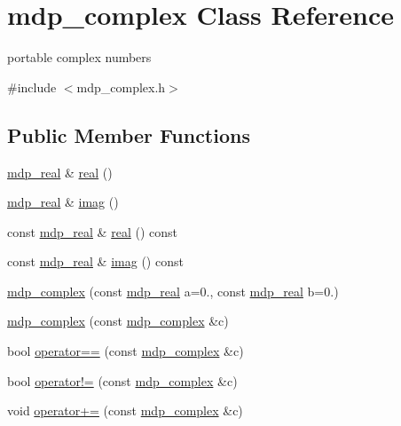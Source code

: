 \hypertarget{classmdp__complex}{}\section{mdp\+\_\+complex Class Reference}
\label{classmdp__complex}


portable complex numbers  




{\ttfamily \#include $<$mdp\+\_\+complex.\+h$>$}

\subsection*{Public Member Functions}
\begin{DoxyCompactItemize}
\item 
\hyperlink{mdp__global__vars_8h_a69d96b74c791e0bbdb888b3913a69450}{mdp\+\_\+real} \& \hyperlink{classmdp__complex_ad24f185648ad4231abbf362ed1fab64b}{real} ()
\item 
\hyperlink{mdp__global__vars_8h_a69d96b74c791e0bbdb888b3913a69450}{mdp\+\_\+real} \& \hyperlink{classmdp__complex_a6426bc039248f24201db0e4344bf2409}{imag} ()
\item 
const \hyperlink{mdp__global__vars_8h_a69d96b74c791e0bbdb888b3913a69450}{mdp\+\_\+real} \& \hyperlink{classmdp__complex_af691671fa4c4256da287ab8a017d3614}{real} () const
\item 
const \hyperlink{mdp__global__vars_8h_a69d96b74c791e0bbdb888b3913a69450}{mdp\+\_\+real} \& \hyperlink{classmdp__complex_ac44d1a0643e83891df5bfa32d0582e04}{imag} () const
\item 
\hyperlink{classmdp__complex_aeb3ec4ef78af98be64dc82c9a2105820}{mdp\+\_\+complex} (const \hyperlink{mdp__global__vars_8h_a69d96b74c791e0bbdb888b3913a69450}{mdp\+\_\+real} a=0., const \hyperlink{mdp__global__vars_8h_a69d96b74c791e0bbdb888b3913a69450}{mdp\+\_\+real} b=0.)
\item 
\hyperlink{classmdp__complex_a99833fa0efd97e5a5d95afd237ac5c7c}{mdp\+\_\+complex} (const \hyperlink{classmdp__complex}{mdp\+\_\+complex} \&c)
\item 
bool \hyperlink{classmdp__complex_a51ddcf2928115838abd81fd365876d19}{operator==} (const \hyperlink{classmdp__complex}{mdp\+\_\+complex} \&c)
\item 
bool \hyperlink{classmdp__complex_ae2e655d313ce4433ca59dcfb59b94cff}{operator!=} (const \hyperlink{classmdp__complex}{mdp\+\_\+complex} \&c)
\item 
void \hyperlink{classmdp__complex_a082aab81b5bc1b42e1ad09bd0f52d710}{operator+=} (const \hyperlink{classmdp__complex}{mdp\+\_\+complex} \&c)

\end{DoxyCompactItemize}
